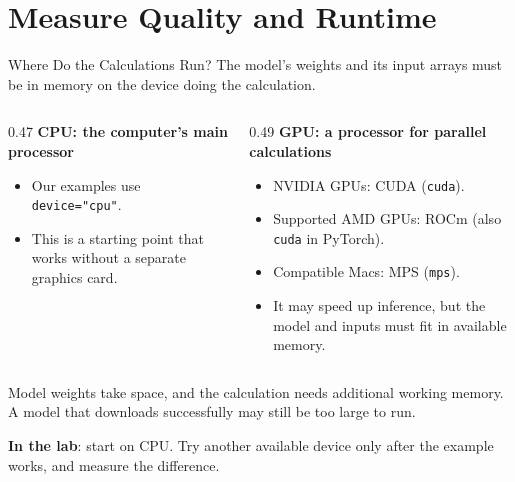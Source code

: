 \documentclass[aspectratio=169]{beamer}
\begin{document}
\section{Measure Quality and Runtime}
\begin{frame}{Where Do the Calculations Run?}
  \small The model's weights and its input arrays must be in memory on the device doing the calculation.
  \par\vspace{0.5em}
  \begin{columns}[T,onlytextwidth]
    \begin{column}{0.47\linewidth}
      \textbf{CPU: the computer's main processor}
      \begin{itemize}
        \item Our examples use \texttt{device="cpu"}.
        \item This is a starting point that works without a separate graphics card.
      \end{itemize}
    \end{column}
    \begin{column}{0.49\linewidth}
      \textbf{GPU: a processor for parallel calculations}
      \begin{itemize}
        \item NVIDIA GPUs: CUDA (\texttt{cuda}).
        \item Supported AMD GPUs: ROCm (also \texttt{cuda} in PyTorch).
        \item Compatible Macs: MPS (\texttt{mps}).
        \item It may speed up inference, but the model and inputs must fit in available memory.
      \end{itemize}
    \end{column}
  \end{columns}
  \par\vspace{0.5em}
  Model weights take space, and the calculation needs additional working memory. A model that downloads successfully may still be too large to run.
  \par\vspace{0.4em}
  \textbf{In the lab}: start on CPU. Try another available device only after the example works, and measure the difference.
\end{frame}
\end{document}

